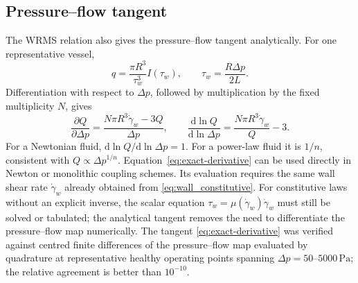 \documentclass[lineno]{jfm}
\begin{document}
\subsection{Pressure--flow tangent}
The WRMS relation also gives the pressure--flow tangent analytically. For one
representative vessel,
\[
q
=
\frac{\pi R^3}{\tau_w^3}
I(\tau_w),
\qquad
\tau_w
=
\frac{R\Delta p}{2L}.
\]
Differentiation with respect to $\Delta p$, followed by multiplication by the
fixed multiplicity $N$, gives
\begin{equation}
\frac{\partial Q}{\partial\Delta p}
=
\frac{
N\pi R^3\dot{\gamma}_w-3Q
}{
\Delta p
},
\qquad
\frac{\mathrm{d}\ln Q}{\mathrm{d}\ln\Delta p}
=
\frac{
N\pi R^3\dot{\gamma}_w
}{
Q
}
-3.
\label{eq:exact-derivative}
\end{equation}
For a Newtonian fluid,
$\mathrm{d}\ln Q/\mathrm{d}\ln\Delta p=1$.
For a power-law fluid it is $1/n$, consistent with
$Q\propto\Delta p^{1/n}$.
Equation~\eqref{eq:exact-derivative} can be used directly in Newton or
monolithic coupling schemes. Its evaluation requires the same wall shear rate
$\dot{\gamma}_w$ already obtained from
\eqref{eq:wall_constitutive}. For constitutive laws without an explicit inverse,
the scalar equation
$\tau_w=\mu(\dot{\gamma}_w)\dot{\gamma}_w$
must still be solved or tabulated; the analytical tangent removes the need to
differentiate the pressure--flow map numerically. The tangent
\eqref{eq:exact-derivative} was verified against centred finite differences
of the pressure--flow map evaluated by quadrature at representative healthy
operating points spanning $\Delta p=50$--$5000\,\mathrm{Pa}$; the relative
agreement is better than $10^{-10}$.
\end{document}
